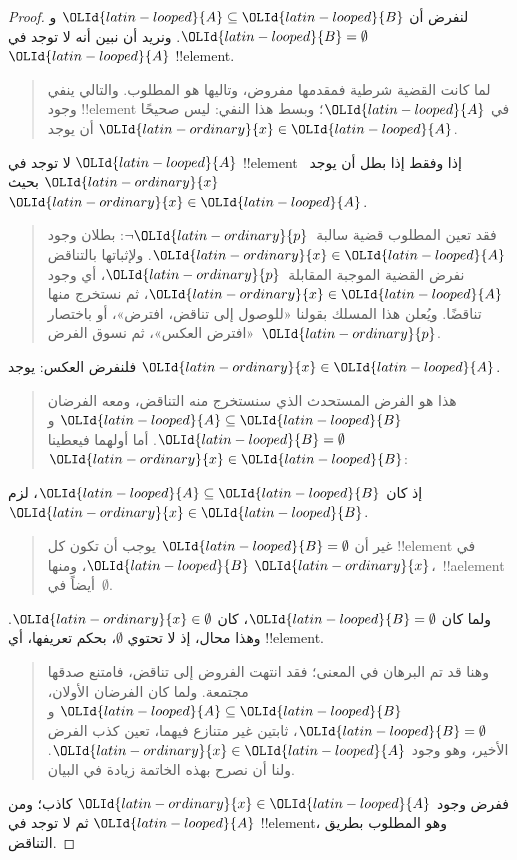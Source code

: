 \documentclass[../../../include/open-logic-section]{subfiles}
\begin{document}
\begin{proof}
  لنفرض أن ${\OLId{latin-looped}{A}} \subseteq {\OLId{latin-looped}{B}}$ و${\OLId{latin-looped}{B}} = \emptyset$. ونريد أن نبين أنه لا توجد
  في ${\OLId{latin-looped}{A}}$ !!{element}.
  \begin{quote}
    لما كانت القضية شرطية فمقدمها مفروض، وتاليها هو المطلوب. والتالي
    ينفي وجود !!{element} في ${\OLId{latin-looped}{A}}$؛ وبسط هذا النفي: ليس صحيحًا أن يوجد
    ${\OLId{latin-ordinary}{x}} \in {\OLId{latin-looped}{A}}$.
  \end{quote}
  لا توجد في ${\OLId{latin-looped}{A}}$ !!{element} إذا وفقط إذا بطل أن يوجد~${\OLId{latin-ordinary}{x}}$
  بحيث ${\OLId{latin-ordinary}{x}} \in {\OLId{latin-looped}{A}}$.
  \begin{quote}
    فقد تعين المطلوب قضية سالبة~$\lnot {\OLId{latin-ordinary}{p}}$: بطلان وجود ${\OLId{latin-ordinary}{x}} \in {\OLId{latin-looped}{A}}$.
    ولإثباتها بالتناقض نفرض القضية الموجبة المقابلة~${\OLId{latin-ordinary}{p}}$، أي وجود
    ${\OLId{latin-ordinary}{x}} \in {\OLId{latin-looped}{A}}$، ثم نستخرج منها تناقضًا. ويُعلن هذا المسلك بقولنا
    «للوصول إلى تناقض، افترض»، أو باختصار «افترض العكس»، ثم نسوق
    الفرض~${\OLId{latin-ordinary}{p}}$.
  \end{quote}
  فلنفرض العكس: يوجد ${\OLId{latin-ordinary}{x}} \in {\OLId{latin-looped}{A}}$.
  \begin{quote}
    هذا هو الفرض المستحدث الذي سنستخرج منه التناقض، ومعه الفرضان
    ${\OLId{latin-looped}{A}} \subseteq {\OLId{latin-looped}{B}}$ و${\OLId{latin-looped}{B}} = \emptyset$. أما أولهما فيعطينا
    ${\OLId{latin-ordinary}{x}} \in {\OLId{latin-looped}{B}}$:
  \end{quote}
  إذ كان ${\OLId{latin-looped}{A}} \subseteq {\OLId{latin-looped}{B}}$، لزم ${\OLId{latin-ordinary}{x}} \in {\OLId{latin-looped}{B}}$.
  \begin{quote}
    غير أن ${\OLId{latin-looped}{B}} = \emptyset$ يوجب أن تكون كل !!{element} في ${\OLId{latin-looped}{B}}$، ومنها
    ${\OLId{latin-ordinary}{x}}$،~!!a{element} أيضاً في~$\emptyset$.
  \end{quote}
  ولما كان ${\OLId{latin-looped}{B}} = \emptyset$، كان ${\OLId{latin-ordinary}{x}} \in \emptyset$. وهذا محال، إذ لا
  تحتوي $\emptyset$، بحكم تعريفها، أي !!{element}.
  \begin{quote}
    وهنا قد تم البرهان في المعنى؛ فقد انتهت الفروض إلى تناقض، فامتنع
    صدقها مجتمعة. ولما كان الفرضان الأولان، ${\OLId{latin-looped}{A}} \subseteq {\OLId{latin-looped}{B}}$ و
    ${\OLId{latin-looped}{B}} = \emptyset$، ثابتين غير متنازع فيهما، تعين كذب الفرض الأخير،
    وهو وجود ${\OLId{latin-ordinary}{x}} \in {\OLId{latin-looped}{A}}$. ولنا أن نصرح بهذه الخاتمة زيادة في البيان.
  \end{quote}
  ففرض وجود ${\OLId{latin-ordinary}{x}} \in {\OLId{latin-looped}{A}}$ كاذب؛ ومن ثم لا توجد في ${\OLId{latin-looped}{A}}$ !!{element}، وهو
  المطلوب بطريق التناقض.
\end{proof}
\end{document}

